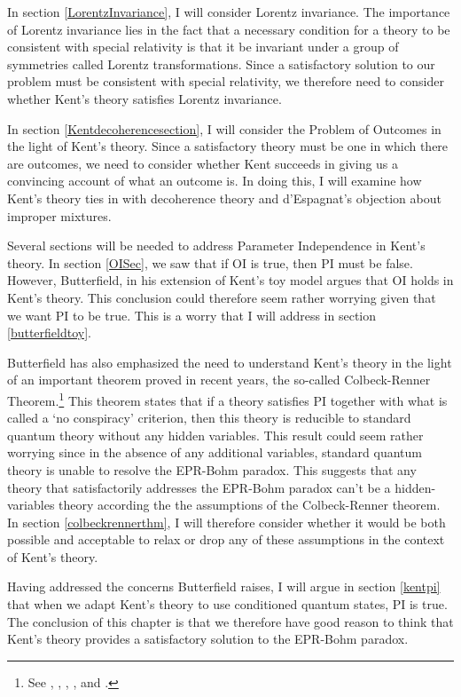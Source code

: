 In section \ref{LorentzInvariance}, I will consider Lorentz invariance. The importance of Lorentz invariance lies in the fact that a necessary condition for a theory to be consistent with special relativity is that it be invariant under a group of symmetries called Lorentz transformations. Since a satisfactory solution to our problem must be consistent with special relativity, we therefore need to consider whether Kent's theory satisfies Lorentz invariance. 

In section \ref{Kentdecoherencesection}, I will consider the Problem of Outcomes in the light of Kent's theory. Since a satisfactory theory must be one in which there are outcomes, we need to consider whether Kent succeeds in giving us a convincing account of what an outcome is. In doing this, I will examine how Kent's theory ties in with decoherence theory and d'Espagnat's objection about improper mixtures. 

Several sections will be needed to address Parameter Independence in Kent's theory. In section \ref{OISec}, we saw that if OI is true, then PI must be false. However, Butterfield, in his extension of Kent's toy model argues that OI holds in Kent's theory. This  conclusion could therefore seem rather worrying given that we want PI to be true. This is a worry that I will address in section  \ref{butterfieldtoy}.

Butterfield has also emphasized the need to understand Kent's theory in the light of an important theorem proved in recent years, the so-called Colbeck-Renner Theorem.\footnote{See \cite{LeegwaterGijs2016Aitf}, \cite{ColbeckRoger2011Neoq}, \cite{ColbeckRoger2012Tcoq}, \cite{LandsmanK2015OtCt}, and \cite{Landsman}.} This theorem states that if a theory satisfies PI together with what is called a `no conspiracy' criterion, then this theory is reducible to standard quantum theory without any hidden variables. This result could seem rather worrying since in the absence of any additional variables, standard quantum theory is unable to resolve the EPR-Bohm paradox. This  suggests that any theory that satisfactorily addresses the  EPR-Bohm paradox can't be a hidden-variables theory according the the assumptions of the Colbeck-Renner theorem. In section \ref{colbeckrennerthm}, I will therefore consider whether it would be both possible and acceptable to relax or drop any of these assumptions in the context of Kent's theory.

Having addressed the concerns Butterfield raises,  I will argue in section \ref{kentpi} that when we adapt Kent's theory to use conditioned quantum states, PI is true. The conclusion of this chapter is that we therefore have good reason to think that Kent's theory provides a satisfactory solution to the EPR-Bohm paradox. 


